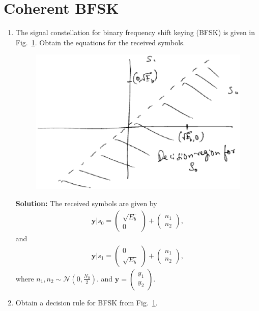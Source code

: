 \documentclass[journal,8pt,onecolumn]{IEEEtran}
\newcommand\figref{Fig.~\ref}
\newcommand{\solution}{\noindent \textbf{Solution: }}
\newcommand{\myvec}[1]{\ensuremath{\begin{pmatrix}#1\end{pmatrix}}}
\providecommand{\gauss}[2]{\mathcal{N}\ensuremath{\left(#1,#2\right)}}
\begin{document}
\section{Coherent BFSK}
\begin{enumerate}
\item
The signal constellation for binary frequency shift keying (BFSK) is given in \figref{fig:bfsk_const}.
Obtain the equations for the received symbols.

\begin{figure}[H]
\centering
\includegraphics[width=\columnwidth/2]{./figs/bfsk_const.eps}
\caption{}
\label{fig:bfsk_const}
\end{figure}
\solution
The received symbols are given by
\begin{align}
\mathbf{y}|s_0 = 
\myvec{
\sqrt{E_b} \\
0
}
+
\myvec{
 n_{1}\\
n_{2}
},
\end{align}
and 
\begin{align}
\mathbf{y}|s_1 = 
\myvec{
0\\
\sqrt{E_b} 
}
+
\myvec{
n_{1}\\
 n_{2}
},
\end{align}
where $n_1,n_2 \sim \gauss{0}{\frac{N_0}{2}}$. and
$
\mathbf{y} = 
\myvec{
y_{1}\\
 y_{2}
}
$.
\item
Obtain a decision rule for BFSK from \figref{fig:bfsk_const}.


\end{enumerate}
\end{document}
